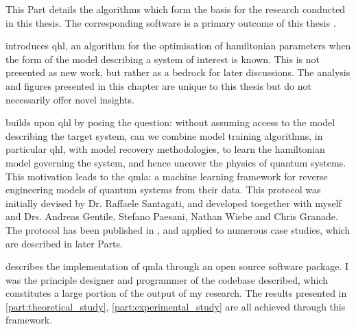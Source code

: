 \glsresetall
This Part details the algorithms which form the basis for the research conducted in this thesis. 
The corresponding software is a primary outcome of this thesis \cite{flynn2021Quantum, flynn2021QMLA, qmla_docs}.

\par 
\vspace{1cm}

 introduces \gls{qhl}, an algorithm for the optimisation of \gls{hamiltonian} parameters
    when the form of the model describing a system of interest is known. 
    This is not presented as new work, but rather as a bedrock for later discussions. 
    The analysis and figures presented in this chapter are unique to this thesis but do not necessarily offer novel insights. 
\par 
\vspace{1cm}
 builds upon \gls{qhl} by posing the question: 
    without assuming access to the model describing the target system, can we combine model training algorithms, 
    in particular \gls{qhl}, with model recovery methodologies, to learn the \gls{hamiltonian} model 
    governing the system, and hence uncover the physics of quantum systems. 
    This motivation leads to the \acrfull{qmla}: 
    a machine learning framework for reverse engineering models of quantum systems from their data.
    This protocol was initially devised by Dr. Raffaele Santagati, 
    and developed toegether with myself and Drs. Andreas Gentile, Stefano Paesani, Nathan Wiebe and Chris Granade. 
    The protocol has been published in \cite{gentile2020learning}, 
    and applied to numerous case studies, which are described in later Parts. 
\par
\vspace{1cm}

 describes the implementation of \gls{qmla} through an open source software package. 
I was the principle designer and programmer of the codebase described, which constitutes a large portion of the output of my research. 
The results presented in \cref{part:theoretical_study}, \cref{part:experimental_study} are all achieved through this framework. 
